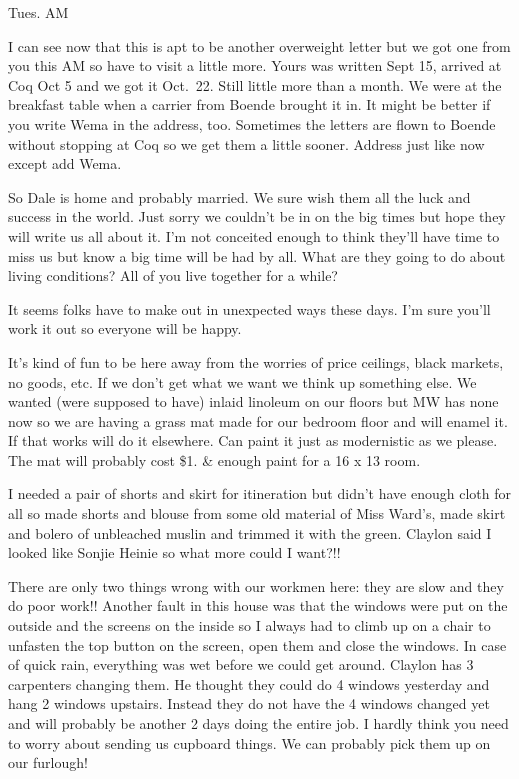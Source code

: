 \documentclass[
]{book}
\begin{document}
Tues. AM

I can see now that this is apt to be another overweight letter but we got one from you this AM so have to visit a little more. Yours was written Sept 15, arrived at Coq Oct 5 and we got it Oct.~22. Still little more than a month. We were at the breakfast table when a carrier from Boende brought it in. It might be better if you write Wema in the address, too. Sometimes the letters are flown to Boende without stopping at Coq so we get them a little sooner. Address just like now except add Wema.

So Dale is home and probably married. We sure wish them all the luck and success in the world. Just sorry we couldn't be in on the big times but hope they will write us all about it. I'm not conceited enough to think they'll have time to miss us but know a big time will be had by all. What are they going to do about living conditions? All of you live together for a while?

It seems folks have to make out in unexpected ways these days. I'm sure you'll work it out so everyone will be happy.

It's kind of fun to be here away from the worries of price ceilings, black markets, no goods, etc. If we don't get what we want we think up something else. We wanted (were supposed to have) inlaid linoleum on our floors but MW has none now so we are having a grass mat made for our bedroom floor and will enamel it. If that works will do it elsewhere. Can paint it just as modernistic as we please. The mat will probably cost \$1. \& enough paint for a 16 x 13 room.

I needed a pair of shorts and skirt for itineration but didn't have enough cloth for all so made shorts and blouse from some old material of Miss Ward's, made skirt and bolero of unbleached muslin and trimmed it with the green. Claylon said I looked like Sonjie Heinie so what more could I want?!!

There are only two things wrong with our workmen here: they are slow and they do poor work!! Another fault in this house was that the windows were put on the outside and the screens on the inside so I always had to climb up on a chair to unfasten the top button on the screen, open them and close the windows. In case of quick rain, everything was wet before we could get around. Claylon has 3 carpenters changing them. He thought they could do 4 windows yesterday and hang 2 windows upstairs. Instead they do not have the 4 windows changed yet and will probably be another 2 days doing the entire job. I hardly think you need to worry about sending us cupboard things. We can probably pick them up on our furlough!
\end{document}
